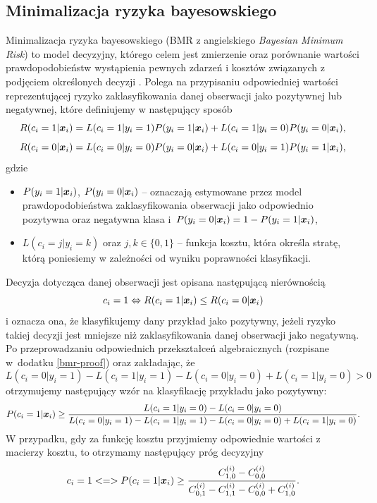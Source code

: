 \documentclass[inzynierska]{pwr_wmat_praca_dyplomowa}
\theoremstyle{plain}
\numberwithin{theorem}{chapter}
\theoremstyle{definition}
\numberwithin{theorem}{chapter}
\begin{document}
\subsection{Minimalizacja ryzyka bayesowskiego}
\label{bmr}
Minimalizacja ryzyka bayesowskiego (BMR z angielskiego \textit{Bayesian Minimum Risk}) to model decyzyjny, którego celem jest zmierzenie oraz porównanie wartości prawdopodobieństw wystąpienia pewnych zdarzeń i kosztów związanych z podjęciem określonych decyzji  \cite{CSCCFD}. Polega na przypisaniu odpowiedniej wartości reprezentującej ryzyko zaklasyfikowania danej obserwacji jako pozytywnej lub negatywnej, które definiujemy w następujący sposób
$$ R(c_i = 1|\boldsymbol{x}_{i}) = L(c_i = 1|y_i = 1)P(y_i = 1|\boldsymbol{x}_{i}) + L(c_i = 1|y_i = 0)P(y_i = 0|\boldsymbol{x}_{i}) \text{,}$$
$$ R(c_i = 0|\boldsymbol{x}_{i}) = L(c_i = 0|y_i = 0)P(y_i = 0|\boldsymbol{x}_{i}) + L(c_i = 0|y_i = 1)P(y_i = 1|\boldsymbol{x}_{i}) \text{,}$$
gdzie
\begin{itemize}
	\item $P(y_i = 1|\boldsymbol{x}_{i})$, $P(y_i = 0|\boldsymbol{x}_{i})$ -- oznaczają estymowane przez model prawdopodobieństwa zaklasyfikowania obserwacji jako odpowiednio pozytywna oraz negatywna klasa i~$P(y_i = 0|\boldsymbol{x}_{i}) = 1 - P(y_i = 1|\boldsymbol{x}_{i})$,
	\item $L(c_i = j|y_i = k)$ oraz $j,k \in \{0, 1\}$ -- funkcja kosztu, która określa stratę, którą poniesiemy w zależności od wyniku poprawności klasyfikacji.
\end{itemize}{}
Decyzja dotycząca danej obserwacji jest opisana następującą nierównością
$$ c_i = 1 \Leftrightarrow R(c_i = 1|\boldsymbol{x}_{i}) \leq R(c_i = 0|\boldsymbol{x}_{i})$$
i oznacza ona, że klasyfikujemy dany przykład jako pozytywny, jeżeli ryzyko takiej decyzji jest mniejsze niż zaklasyfikowania danej obserwacji jako negatywną. 
Po przeprowadzaniu odpowiednich przekształceń algebraicznych (rozpisane w~dodatku \ref{bmr-proof}) oraz zakładając, że 
$$ L(c_i = 0|y_i = 1) - L(c_i = 1|y_i = 1) - L(c_i = 0|y_i = 0) + L(c_i = 1|y_i = 0) > 0 $$ 
otrzymujemy następujący wzór na klasyfikację przykładu jako pozytywny:
$$ P(c_i = 1|\boldsymbol{x}_{i}) \ge \frac{L(c_i = 1|y_i = 0) - L(c_i = 0|y_i = 0)}{L(c_i = 0|y_i = 1) - L(c_i = 1|y_i = 1) - L(c_i = 0|y_i = 0) + L(c_i = 1|y_i = 0)} \text{.}$$
W przypadku, gdy za funkcję kosztu przyjmiemy odpowiednie wartości z macierzy kosztu, to otrzymamy następujący próg decyzyjny
$$ c_i = 1 <=> P(c_i = 1|\boldsymbol{x}_{i}) \ge \frac{C^{(i)}_{1,0} - C^{(i)}_{0,0}}{C^{(i)}_{0,1} - C^{(i)}_{1,1} - C^{(i)}_{0,0} + C^{(i)}_{1,0}} \text{.}$$
\end{document}
